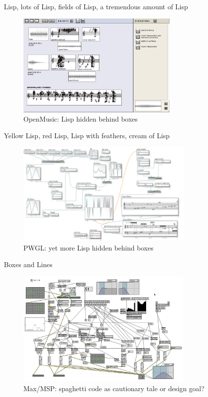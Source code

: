 \begin{frame}{Lisp, lots of Lisp, fields of Lisp, a tremendous amount of Lisp}
    \begin{figure}
    \begin{centering}
    \includegraphics[height=2in]{assets/include-open-music.png}
    \caption{OpenMusic: Lisp hidden behind boxes}
    \end{centering}
    \end{figure}
\end{frame}

\begin{frame}{Yellow Lisp, red Lisp, Lisp with feathers, cream of Lisp}
    \begin{figure}
    \begin{centering}
    \includegraphics[height=2in]{assets/include-pwgl.jpg}
    \caption{PWGL: yet more Lisp hidden behind boxes}
    \end{centering}
    \end{figure}
\end{frame}

\begin{frame}{Boxes and Lines}
    \begin{figure}
    \begin{centering}
    \includegraphics[height=2.25in]{assets/include-max.jpg}
    \caption{Max/MSP: spaghetti code as cautionary tale or design goal?}
    \end{centering}
    \end{figure}
\end{frame}